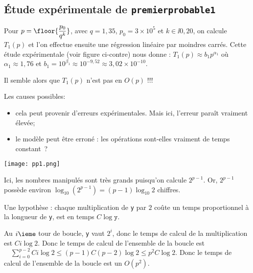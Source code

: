 \subsection{Étude expérimentale de \texttt{premierprobable1}}

\begin{minipage}[c]{.48\linewidth}
Pour $p = \floor{\dfrac{p_0}{q^k}}$, avec $q = 1,35$, $p_0 = 3\times 10^5$ et $k\in\ii{0,20}$, on calcule $T_1(p)$ et l'on effectue ensuite une régression linéaire par moindres carrés. Cette étude expérimentale 
(voir figure ci-contre)
nous donne :
$  T_{1}(p)\approx b_{1} p^{\alpha_{1}}$ où $\alpha_{1}\approx 1,76$
et  $b_{1} = 10^{\beta_{1}} \approx 10^{-9,52}  \approx 3,02 \times 10^{-10}$.

Il semble alors que $T_1(p)$ n'est pas en $O(p)$ !!!

Les causes possibles:
\begin{itemize}
\item[\textbullet] cela peut provenir d'erreurs expérimentales. Mais ici, l'erreur paraît vraiment 
élevée;
\item[\textbullet] le modèle peut être erroné : les opérations sont-elles vraiment de temps constant~?
\end{itemize}
\end{minipage} \hfill
\begin{minipage}[c]{.48\linewidth}
  \begin{center}
    \texttt{[image: pp1.png]}
  \end{center}
\end{minipage} 




Ici, les nombres manipulés sont très grands puisqu'on calcule
$2^{p-1}$. Or, $2^{p-1}$ possède environ $\log_{10} (2^{p-1}) =
(p-1)\log_{10} 2$ chiffres.

Une hypothèse : chaque multiplication de \texttt{y} par $2$ coûte un temps proportionnel à la longueur de \texttt{y}, est en temps $C \log \texttt{y}$.

Au $i\ieme$ tour de boucle, \texttt{y} vaut $2^{i}$, donc le temps de
calcul de la multiplication est $C i \log 2$. Donc le temps de calcul
de l'ensemble de la boucle est $\quad   \sum_{i=0}^{p-2} C i \log 2 \leq (p-1) C (p-2)\log 2\leq p^{2}C\log 2$.
Donc le temps de calcul de l'ensemble de la boucle est un $O(p^{2})$.

